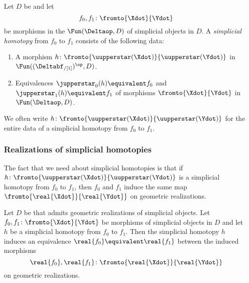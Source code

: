 \begin{definition}[{\HA{Definition}{7.2.1.6}}]\label{def:simplicialhomotopy}
	Let $ D $ be \acategory and let
	\begin{equation*}
		f_0,f_1 \colon \fromto{\Xdot}{\Ydot}
	\end{equation*}
	be morphisms in the \category $ \Fun(\Deltaop,D) $ of simplicial objects in $ D $.
	A \textit{simplicial homotopy} from $ f_0 $ to $ f_1 $ consists of the following data:
	\begin{enumerate}
		\item A morphism $ h \colon \fromto{\uupperstar(\Xdot)}{\uupperstar(\Ydot)} $ in $ \Fun((\Deltabf_{/[1]})^{\op},D) $.

		\item Equivalences $ \jupperstar_0(h) \equivalent f_0 $ and $ \jupperstar_1(h) \equivalent f_1 $ of morphisms $ \fromto{\Xdot}{\Ydot} $ in $ \Fun(\Deltaop,D) $.
	\end{enumerate}

	We often write $ h \colon \fromto{\uupperstar(\Xdot)}{\uupperstar(\Ydot)} $ for the entire data of a simplicial homotopy from $ f_0 $ to $ f_1 $.
\end{definition}



\subsubsection{Realizations of simplicial homotopies}

The fact that we need about simplicial homotopies is that if $ h \colon \fromto{\uupperstar(\Xdot)}{\uupperstar(\Ydot)} $ is a simplicial homotopy from $ f_0 $ to $ f_1 $, then $ f_0 $ and $ f_1 $ induce the same map $ \fromto{\real{\Xdot}}{\real{\Ydot}} $ on geometric realizations.

\begin{lemma}\label{lem:simplicialhomotopyequivalentmaps}
	Let $ D $ be \acategory that admits geometric realizations of simplicial objects.
	Let $ f_0, f_1 \colon \fromto{\Xdot}{\Ydot} $ be morphisms of simplicial objects in $ D $ and let $ h $ be a simplicial homotopy from $ f_0 $ to $ f_1 $.
	Then the simplicial homotopy $ h $ induces an equivalence $ \real{f_0} \equivalent \real{f_1} $ between the induced morphisms
	\begin{equation*}
		\real{f_0}, \real{f_1} \colon \fromto{\real{\Xdot}}{\real{\Ydot}}
	\end{equation*}
	on geometric realizations.
\end{lemma}


